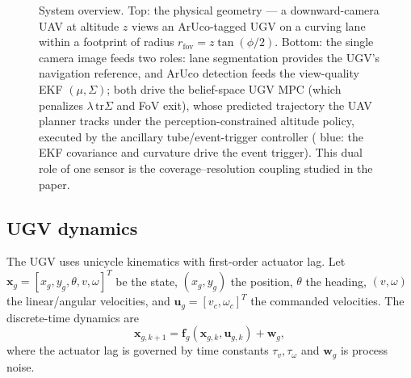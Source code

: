 \documentclass[letterpaper, 10 pt, conference]{ieeeconf}  %
\begin{document}
\begin{figure}[t]
{}
\caption{System overview. {Top:} the physical geometry --- a downward-camera UAV at
altitude $z$ views an ArUco-tagged UGV on a curving lane within a footprint of radius
$r_{\mathrm{fov}}=z\tan(\phi/2)$. {Bottom:} the single camera image feeds {two}
roles: lane segmentation provides the UGV's navigation reference, and ArUco detection feeds the
view-quality EKF $(\mu,\Sigma)$; both drive the belief-space UGV MPC (which penalizes
$\lambda\,\mathrm{tr}\Sigma$ and FoV exit), whose predicted trajectory the UAV planner tracks
under the perception-constrained altitude policy, executed by the ancillary tube/event-trigger
controller ( {blue:} the EKF covariance and curvature drive the event trigger). This
dual role of one sensor is the coverage--resolution coupling studied in the paper.}
\label{fig:system}
\end{figure}

\subsection{UGV dynamics}
The UGV uses unicycle kinematics with first-order actuator lag. Let
$\mathbf{x}_g = [x_g, y_g, \theta, v, \omega]^T$ be the state, $(x_g,y_g)$ the
position, $\theta$ the heading, $(v,\omega)$ the linear/angular velocities, and
$\mathbf{u}_g = [v_c, \omega_c]^T$ the commanded velocities. The discrete-time
dynamics are
\begin{equation}
\mathbf{x}_{g,k+1} = \mathbf{f}_g(\mathbf{x}_{g,k}, \mathbf{u}_{g,k}) + \mathbf{w}_g,
\end{equation}
where the actuator lag is governed by time constants $\tau_v,\tau_\omega$ and
$\mathbf{w}_g$ is process noise.
\end{document}
